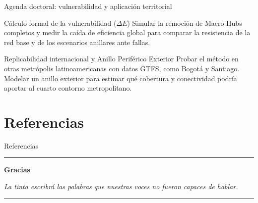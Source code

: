 \begin{frame}{Agenda doctoral: vulnerabilidad y aplicación territorial}
  \begin{block}{Cálculo formal de la vulnerabilidad ($\Delta E$)}
    Simular la remoción de Macro-Hubs completos y medir la caída de eficiencia
    global para comparar la resistencia de la red base y de los escenarios
    anillares ante fallas.
  \end{block}

  \begin{block}{Replicabilidad internacional y Anillo Periférico Exterior}
    Probar el método en otras metrópolis latinoamericanas con datos GTFS,
    como Bogotá y Santiago. Modelar un anillo exterior para estimar qué
    cobertura y conectividad podría aportar al cuarto contorno metropolitano.
  \end{block}
\end{frame}

\section*{Referencias}
\begin{frame}[allowframebreaks]{Referencias}
  
  
\end{frame}

\begin{frame}[plain]
  \begin{center}
    {\color{ColorAcento}\rule{0.6\textwidth}{1.5pt}}\par\medskip
    {\Large\bfseries\color{ColorPrincipal} Gracias\par}
    \medskip
    \begin{minipage}{0.73\textwidth}
      \centering
      \itshape La tinta escribrá las palabras que nuestras voces no fueron capaces de hablar.
    \end{minipage}\par
    \medskip
    {\normalsize \Autor\par}
    {\small \MateriaCorta\par}
    {\small \Semestre\par}
    \medskip
    {\color{ColorAcento}\rule{0.6\textwidth}{1.5pt}}\par
  \end{center}
\end{frame}
